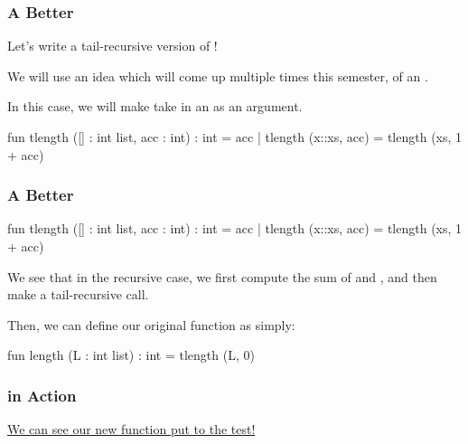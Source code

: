 \documentclass[aspectratio=169]{beamer}
\begin{document}
\begin{frame}[fragile]
  \frametitle{A Better }

  Let's write a tail-recursive version of !

  \pause
  \vspace{\fill}

  We will use an idea which will come up multiple times this semester, of an .

  \pause
  \vspace{\fill}


  \pause
  \vspace{\fill}

  In this case, we will make  take in an  as an argument. 

  \pause
  \vspace{\fill}

  \begin{codeblock}
    fun tlength ([] : int list, acc : int) : int = acc
      | tlength (x::xs, acc) = tlength (xs, 1 + acc) 
  \end{codeblock}
\end{frame}

\begin{frame}[fragile]
  \frametitle{A Better }

  \begin{codeblock}
    fun tlength ([] : int list, acc : int) : int = acc
      | tlength (x::xs, acc) = tlength (xs, 1 + acc) 
  \end{codeblock}

  \pause
  \vspace{\fill}

  We see that in the recursive case, we first compute the sum of  and ,
  and then make a tail-recursive call.

  \pause
  \vspace{\fill}

  Then, we can define our original  function as simply:
  \begin{codeblock}
    fun length (L : int list) : int = tlength (L, 0)
  \end{codeblock}
\end{frame}

\begin{frame}[fragile]
  \frametitle{ in Action}

  \color{blue} \href{https://asciinema.org/a/587210}{We can see our new  function put to the test!}

\end{frame}
\end{document}
